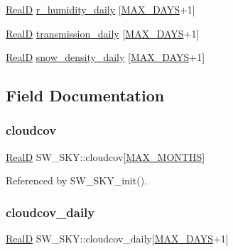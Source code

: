 \begin{DoxyCompactItemize}
\item 
\hyperlink{generic_8h_af1c105fd5732f70b91ddaeda0cc340e3}{RealD} \hyperlink{struct_s_w___s_k_y_a5abbc167044f7218819f1ab24c8efd9a}{r\+\_\+humidity\+\_\+daily} \mbox{[}\hyperlink{_times_8h_a01f08d46080872b9f4284873b7f9dee4}{M\+A\+X\+\_\+\+D\+A\+YS}+1\mbox{]}
\item 
\hyperlink{generic_8h_af1c105fd5732f70b91ddaeda0cc340e3}{RealD} \hyperlink{struct_s_w___s_k_y_a62644fcb44b1b155c44df63060efb6f1}{transmission\+\_\+daily} \mbox{[}\hyperlink{_times_8h_a01f08d46080872b9f4284873b7f9dee4}{M\+A\+X\+\_\+\+D\+A\+YS}+1\mbox{]}
\item 
\hyperlink{generic_8h_af1c105fd5732f70b91ddaeda0cc340e3}{RealD} \hyperlink{struct_s_w___s_k_y_af459243a729395ba95b534bb03af3eaa}{snow\+\_\+density\+\_\+daily} \mbox{[}\hyperlink{_times_8h_a01f08d46080872b9f4284873b7f9dee4}{M\+A\+X\+\_\+\+D\+A\+YS}+1\mbox{]}
\end{DoxyCompactItemize}


\subsection{Field Documentation}
\mbox{\label{struct_s_w___s_k_y_af017b36b9b0ac37ede5f754370feacd6}} 
\subsubsection{\texorpdfstring{cloudcov}{cloudcov}}
{\footnotesize\ttfamily \hyperlink{generic_8h_af1c105fd5732f70b91ddaeda0cc340e3}{RealD} S\+W\+\_\+\+S\+K\+Y\+::cloudcov\mbox{[}\hyperlink{_times_8h_a9c97e6841188b672e984a4eba7479277}{M\+A\+X\+\_\+\+M\+O\+N\+T\+HS}\mbox{]}}



Referenced by S\+W\+\_\+\+S\+K\+Y\+\_\+init().

\mbox{\label{struct_s_w___s_k_y_a5bc5d73d1ff5698d0854ed96b1f9efd9}} 
\subsubsection{\texorpdfstring{cloudcov\+\_\+daily}{cloudcov\_daily}}
{\footnotesize\ttfamily \hyperlink{generic_8h_af1c105fd5732f70b91ddaeda0cc340e3}{RealD} S\+W\+\_\+\+S\+K\+Y\+::cloudcov\+\_\+daily\mbox{[}\hyperlink{_times_8h_a01f08d46080872b9f4284873b7f9dee4}{M\+A\+X\+\_\+\+D\+A\+YS}+1\mbox{]}}



